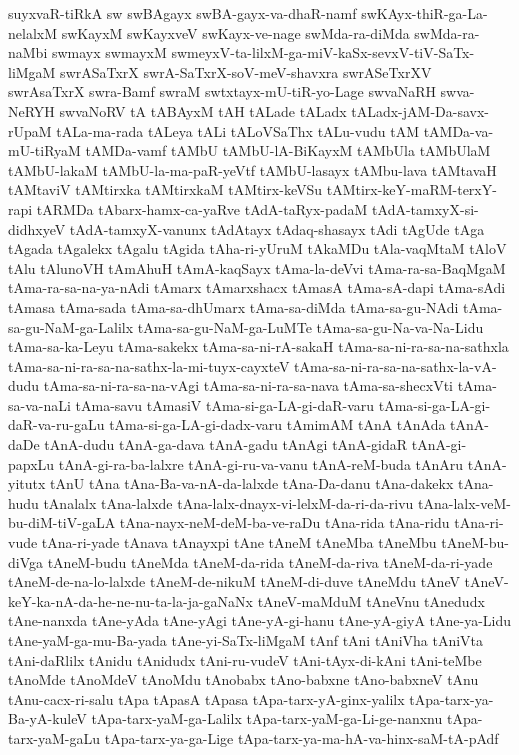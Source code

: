 {suyxvaR-tiRkA
sw
swBAgayx
swBA-gayx-va-dhaR-namf
swKAyx-thiR-ga-La-nelalxM
swKayxM
swKayxveV
swKayx-ve-nage
swMda-ra-diMda
swMda-ra-naMbi
swmayx
swmayxM
swmeyxV-ta-lilxM-ga-miV-kaSx-sevxV-tiV-SaTx-liMgaM
swrASaTxrX
swrA-SaTxrX-soV-meV-shavxra
swrASeTxrXV
swrAsaTxrX
swra-Bamf
swraM
swtxtayx-mU-tiR-yo-Lage
swvaNaRH
swva-NeRYH
swvaNoRV
tA
tABAyxM
tAH
tALade
tALadx
tALadx-jAM-Da-savx-rUpaM
tALa-ma-rada
tALeya
tALi
tALoVSaThx
tALu-vudu
tAM
tAMDa-va-mU-tiRyaM
tAMDa-vamf
tAMbU
tAMbU-lA-BiKayxM
tAMbUla
tAMbUlaM
tAMbU-lakaM
tAMbU-la-ma-paR-yeVtf
tAMbU-lasayx
tAMbu-lava
tAMtavaH
tAMtaviV
tAMtirxka
tAMtirxkaM
tAMtirx-keVSu
tAMtirx-keY-maRM-terxY-rapi
tARMDa
tAbarx-hamx-ca-yaRve
tAdA-taRyx-padaM
tAdA-tamxyX-si-didhxyeV
tAdA-tamxyX-vanunx
tAdAtayx
tAdaq-shasayx
tAdi
tAgUde
tAga
tAgada
tAgalekx
tAgalu
tAgida
tAha-ri-yUruM
tAkaMDu
tAla-vaqMtaM
tAloV
tAlu
tAlunoVH
tAmAhuH
tAmA-kaqSayx
tAma-la-deVvi
tAma-ra-sa-BaqMgaM
tAma-ra-sa-na-ya-nAdi
tAmarx
tAmarxshacx
tAmasA
tAma-sA-dapi
tAma-sAdi
tAmasa
tAma-sada
tAma-sa-dhUmarx
tAma-sa-diMda
tAma-sa-gu-NAdi
tAma-sa-gu-NaM-ga-Lalilx
tAma-sa-gu-NaM-ga-LuMTe
tAma-sa-gu-Na-va-Na-Lidu
tAma-sa-ka-Leyu
tAma-sakekx
tAma-sa-ni-rA-sakaH
tAma-sa-ni-ra-sa-na-sathxla
tAma-sa-ni-ra-sa-na-sathx-la-mi-tuyx-cayxteV
tAma-sa-ni-ra-sa-na-sathx-la-vA-dudu
tAma-sa-ni-ra-sa-na-vAgi
tAma-sa-ni-ra-sa-nava
tAma-sa-shecxVti
tAma-sa-va-naLi
tAma-savu
tAmasiV
tAma-si-ga-LA-gi-daR-varu
tAma-si-ga-LA-gi-daR-va-ru-gaLu
tAma-si-ga-LA-gi-dadx-varu
tAmimAM
tAnA
tAnAda
tAnA-daDe
tAnA-dudu
tAnA-ga-dava
tAnA-gadu
tAnAgi
tAnA-gidaR
tAnA-gi-papxLu
tAnA-gi-ra-ba-lalxre
tAnA-gi-ru-va-vanu
tAnA-reM-buda
tAnAru
tAnA-yitutx
tAnU
tAna
tAna-Ba-va-nA-da-lalxde
tAna-Da-danu
tAna-dakekx
tAna-hudu
tAnalalx
tAna-lalxde
tAna-lalx-dnayx-vi-lelxM-da-ri-da-rivu
tAna-lalx-veM-bu-diM-tiV-gaLA
tAna-nayx-neM-deM-ba-ve-raDu
tAna-rida
tAna-ridu
tAna-ri-vude
tAna-ri-yade
tAnava
tAnayxpi
tAne
tAneM
tAneMba
tAneMbu
tAneM-bu-diVga
tAneM-budu
tAneMda
tAneM-da-rida
tAneM-da-riva
tAneM-da-ri-yade
tAneM-de-na-lo-lalxde
tAneM-de-nikuM
tAneM-di-duve
tAneMdu
tAneV
tAneV-keY-ka-nA-da-he-ne-nu-ta-la-ja-gaNaNx
tAneV-maMduM
tAneVnu
tAnedudx
tAne-nanxda
tAne-yAda
tAne-yAgi
tAne-yA-gi-hanu
tAne-yA-giyA
tAne-ya-Lidu
tAne-yaM-ga-mu-Ba-yada
tAne-yi-SaTx-liMgaM
tAnf
tAni
tAniVha
tAniVta
tAni-daRlilx
tAnidu
tAnidudx
tAni-ru-vudeV
tAni-tAyx-di-kAni
tAni-teMbe
tAnoMde
tAnoMdeV
tAnoMdu
tAnobabx
tAno-babxne
tAno-babxneV
tAnu
tAnu-cacx-ri-salu
tApa
tApasA
tApasa
tApa-tarx-yA-ginx-yalilx
tApa-tarx-ya-Ba-yA-kuleV
tApa-tarx-yaM-ga-Lalilx
tApa-tarx-yaM-ga-Li-ge-nanxnu
tApa-tarx-yaM-gaLu
tApa-tarx-ya-ga-Lige
tApa-tarx-ya-ma-hA-va-hinx-saM-tA-pAdf
}
